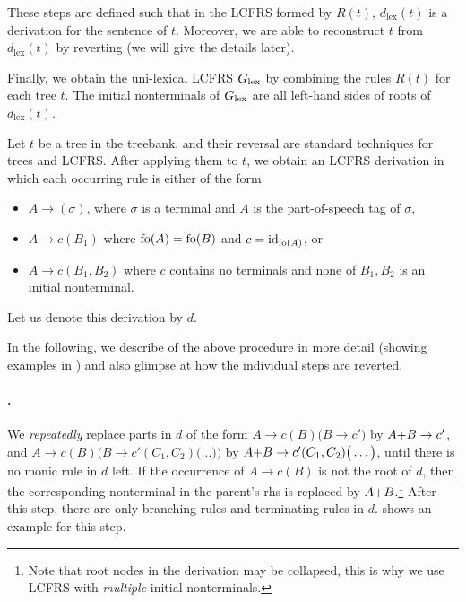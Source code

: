 \documentclass[../document.tex]{subfiles}
\begin{document}
    These steps are defined such that in the LCFRS formed by $R(t)$, $d_{\mathrm{lex}}(t)$ is a derivation for the sentence of $t$.
    Moreover, we are able to reconstruct $t$ from $d_{\mathrm{lex}}(t)$ by reverting  (we will give the details later).

    Finally, we obtain the uni-lexical LCFRS $G_{\mathrm{lex}}$ by combining the rules $R(t)$ for each tree $t$.
    The initial nonterminals of $G_{\mathrm{lex}}$ are all left-hand sides of roots of $d_{\mathrm{lex}}(t)$.

    Let $t$ be a tree in the treebank.
     and their reversal are standard techniques for trees and LCFRS.
    After applying them to $t$, we obtain an LCFRS derivation in which each occurring rule is either of the form
    \begin{itemize}[nosep]
        \item \(A \to (\sigma)\), where $\sigma$ is a terminal and \(A\) is the part-of-speech tag of $\sigma$,
        \item \(A \to c(B_1)\) where \(\operatorname{fo}(A) = \operatorname{fo}(B)\) and \(c = \operatorname{id}_{\operatorname{fo}(A)}\), or
        \item \(A \to c (B_1, B_2)\) where \(c\) contains no terminals and none of \(B_1, B_2\) is an initial nonterminal.
    \end{itemize}
    Let us denote this derivation by $d$.

    In the following, we describe  of the above procedure in more detail (showing examples in ) and also glimpse at how the individual steps are reverted.


    \paragraph{.}
    We \emph{repeatedly} replace parts in \(d\) of the form
    \(A \to c (B) \big( B \to c' \big) \) by \( A\text+B \to c' \), and
    \(A \to c (B) \Big( B \to c'(C_1, C_2) \big( \ldots \big) \Big) \) by \( A\text+B \to c' (C_1, C_2) \big( \ldots \big) \),
    until there is no monic rule in \(d\) left.
    If the occurrence of \(A \to c (B)\) is not the root of \(d\), then the corresponding nonterminal in the parent's rhs is replaced by \(A\text+B\).\footnote{
        Note that root nodes in the derivation may be collapsed, this is why we use LCFRS with \emph{multiple} initial nonterminals.
    }
    After this step, there are only branching rules and terminating rules in \(d\).
     shows an example for this step.
\end{document}
